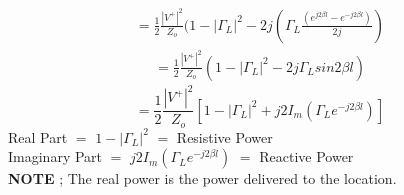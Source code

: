   \begin{align*} 
  =\frac{1}{2} \frac{{ | V^+ | }^2}{Z_o} ( 1 - {|\Gamma_L}|^2 -2j(\Gamma_L \frac{ ( e^{j2\beta l} - e^{-j2\beta l})}{2j}) 
  \end{align*}
  \begin{align*} 
  =\frac{1}{2} \frac{{ | V^+ | }^2}{Z_o} ( 1 - {|\Gamma_L}|^2 -2j\Gamma_L sin2\beta l ) 
  \end{align*}
  \begin{equation} 
  =\frac{1}{2} \frac{{ | V^+ | }^2}{Z_o}  [1 - {|\Gamma_L}|^2 + j2I_m(\Gamma_Le^{-j2\beta l})]
  \end{equation}
   Real Part $=$ $1 - {|\Gamma_L}|^2$ $=$ Resistive Power\\
   
   Imaginary Part $=$ $ j2I_m(\Gamma_Le^{-j2\beta l})$ $=$ Reactive Power\\
   
   \textbf{NOTE} ; The real power is the power delivered to the location.\\
   
